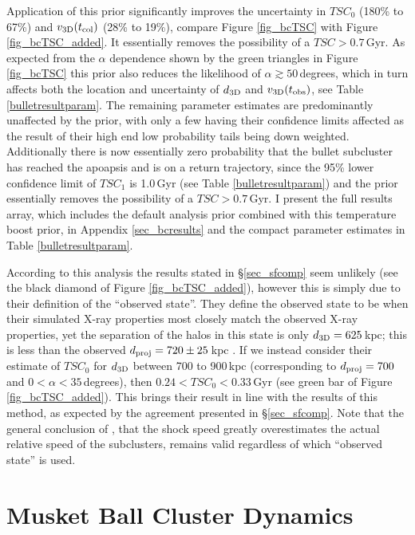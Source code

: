 \documentclass[12pt]{emulateapj}
\begin{document}
Application of this prior significantly improves the uncertainty in $TSC_0$ (180\% to 67\%)  and $v_{\rm 3D}(t_{\rm col})$ (28\% to 19\%), compare Figure \ref{fig_bcTSC} with Figure \ref{fig_bcTSC_added}.
It essentially removes the possibility of a $TSC > 0.7$\,Gyr.
As expected from the $\alpha$ dependence shown by the green triangles in Figure \ref{fig_bcTSC} this prior also reduces the likelihood of $\alpha \gtrsim 50$\,degrees, which in turn affects both the location and uncertainty of $d_{\rm3D}$ and $v_{\rm 3D}(t_{\rm obs})$, see Table \ref{bulletresultparam}. 
The remaining parameter estimates are predominantly unaffected by the prior, with only a few having their confidence limits affected as the result of their high end low probability tails being down weighted.
Additionally there is now essentially zero probability that the bullet subcluster has reached the apoapsis and is on a return trajectory, since the 95\% lower confidence limit of $TSC_1$ is 1.0\,Gyr (see Table \ref{bulletresultparam}) and the prior essentially removes the possibility of a $TSC > 0.7$\,Gyr.
I present the full results array, which includes the default analysis prior combined with this temperature boost prior, in Appendix \ref{sec_bcresults} and the compact parameter estimates in Table \ref{bulletresultparam}.

According to this analysis the \citet{Springel:2007bg} results stated in \S\ref{sec_sfcomp} seem unlikely (see the black diamond of Figure \ref{fig_bcTSC_added}), however this is simply due to their definition of the ``observed state''.
They define the observed state to be when their simulated X-ray properties most closely match the observed X-ray properties, yet the separation of the halos in this state is only $d_{\rm 3D}=625$\,kpc; this is less than the observed $d_{\rm proj} = 720\pm 25$\,kpc \citep{Bradac:2006be}.
If we instead consider their estimate of $TSC_0$ for $d_{\rm 3D}$ between 700 to 900\,kpc (corresponding to  $d_{\rm proj} = 700$ and $0<\alpha<35$\,degrees), then $0.24<TSC_0<0.33$\,Gyr (see green bar of Figure \ref{fig_bcTSC_added}).
This brings their result in line with the results of this method, as expected by the agreement presented in \S\ref{sec_sfcomp}.
Note that the general conclusion of \citet{Springel:2007bg}, that the  shock speed greatly overestimates the actual relative speed of the subclusters, remains valid regardless of which ``observed state'' is used.

\section{Musket Ball Cluster Dynamics}\label{sec_musketball}
\end{document}
